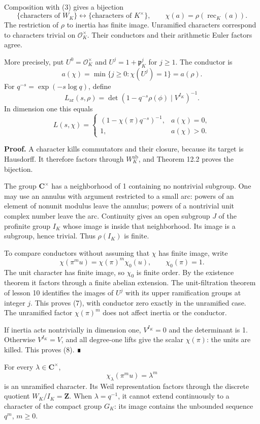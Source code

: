 \documentclass[11pt,a4paper]{article}
\begin{document}
Composition with (3) gives a bijection \[
\{\text{characters of }W_K\}
\longleftrightarrow
\{\text{characters of }K^\times\},\qquad
\chi(a)=\rho(\operatorname{rec}_K(a)).
\tag{6}
\] The restriction of \(\rho\) to inertia has finite image. Unramified
characters correspond to characters trivial on \(\mathcal O_K^\times\).
Their conductors and their arithmetic Euler factors agree.

More precisely, put \(U^0=\mathcal O_K^\times\) and
\(U^j=1+\mathfrak p_K^j\) for \(j\geq1\). The conductor is \[
a(\chi)=\min\{j\geq0:\chi(U^j)=1\}
       =a(\rho).
\tag{7}
\] For \(q^{-s}=\exp(-s\log q)\), define \[
L_{\mathrm{ar}}(s,\rho)
=\det(1-q^{-s}\rho(\phi)\mid V^{I_K})^{-1}.
\] In dimension one this equals \[
L(s,\chi)=
\begin{cases}
(1-\chi(\pi)q^{-s})^{-1},&a(\chi)=0,\\
1,&a(\chi)>0.
\end{cases}
\tag{8}
\]

\textbf{Proof.} A character kills commutators and their closure, because
its target is Hausdorff. It therefore factors through
\(W_K^{\mathrm{ab}}\), and Theorem 12.2 proves the bijection.

The group \(\mathbf C^\times\) has a neighborhood of 1 containing no
nontrivial subgroup. One may use an annulus with argument restricted to
a small arc: powers of an element of nonunit modulus leave the annulus;
powers of a nontrivial unit complex number leave the arc. Continuity
gives an open subgroup \(J\) of the profinite group \(I_K\) whose image
is inside that neighborhood. Its image is a subgroup, hence trivial.
Thus \(\rho(I_K)\) is finite.

To compare conductors without assuming that \(\chi\) has finite image,
write \[
\chi(\pi^m u)=\chi(\pi)^m\chi_0(u),\qquad \chi_0(\pi)=1.
\] The unit character has finite image, so \(\chi_0\) is finite order.
By the existence theorem it factors through a finite abelian extension.
The unit-filtration theorem of lesson 10 identifies the images of
\(U^j\) with its upper ramification groups at integer \(j\). This proves
(7), with conductor zero exactly in the unramified case. The unramified
factor \(\chi(\pi)^m\) does not affect inertia or the conductor.

If inertia acts nontrivially in dimension one, \(V^{I_K}=0\) and the
determinant is 1. Otherwise \(V^{I_K}=V\), and all degree-one lifts give
the scalar \(\chi(\pi)\): the units are killed. This proves (8). ∎

For every \(\lambda\in\mathbf C^\times\), \[
\chi_\lambda(\pi^m u)=\lambda^m
\] is an unramified character. Its Weil representation factors through
the discrete quotient \(W_K/I_K=\mathbf Z\). When \(\lambda=q^{-1}\), it
cannot extend continuously to a character of the compact group \(G_K\):
its image contains the unbounded sequence \(q^m\), \(m\geq0\).
\end{document}
